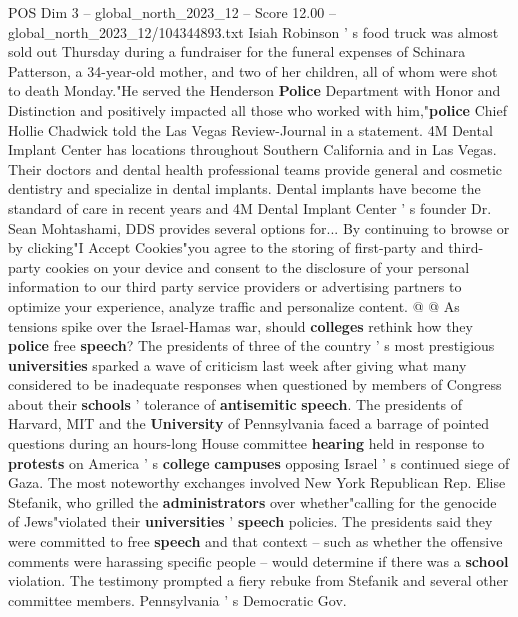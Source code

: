 \begin{textsample}{POS Dim 3 – global\_north\_2023\_12 – Score 12.00 – global\_north\_2023\_12/104344893.txt}  \label{ex:f3_pos_267}
Isiah Robinson ' s food truck was almost sold out Thursday during a fundraiser for the funeral expenses of Schinara Patterson, a 34-year-old mother, and two of her children, all of whom were shot to death Monday."He served the Henderson \textbf{Police} Department with Honor and Distinction and positively impacted all those who worked with him,"\textbf{police} Chief Hollie Chadwick told the Las Vegas Review-Journal in a statement. 4M Dental Implant Center has locations throughout Southern California and in Las Vegas.
Their doctors and dental health professional teams provide general and cosmetic dentistry and specialize in dental implants.
Dental implants have become the standard of care in recent years and 4M Dental Implant Center ' s founder Dr.
Sean Mohtashami, DDS provides several options for...
By continuing to browse or by clicking"I Accept Cookies"you agree to the storing of first-party and third-party cookies on your device and consent to the disclosure of your personal information to our third party service providers or advertising partners to optimize your experience, analyze traffic and personalize content. @ @ As tensions spike over the Israel-Hamas war, should \textbf{colleges} rethink how they \textbf{police} free \textbf{speech}?
The presidents of three of the country ' s most prestigious \textbf{universities} sparked a wave of criticism last week after giving what many considered to be inadequate responses when questioned by members of Congress about their \textbf{schools} ' tolerance of \textbf{antisemitic} \textbf{speech}.
The presidents of Harvard, MIT and the \textbf{University} of Pennsylvania faced a barrage of pointed questions during an hours-long House committee \textbf{hearing} held in response to \textbf{protests} on America ' s \textbf{college} \textbf{campuses} opposing Israel ' s continued siege of Gaza.
The most noteworthy exchanges involved New York Republican Rep.
Elise Stefanik, who grilled the \textbf{administrators} over whether"calling for the genocide of Jews"violated their \textbf{universities} ' \textbf{speech} policies.
The presidents said they were committed to free \textbf{speech} and that context -- such as whether the offensive comments were harassing specific people -- would determine if there was a \textbf{school} violation.
The testimony prompted a fiery rebuke from Stefanik and several other committee members.
Pennsylvania ' s Democratic Gov.

\end{textsample}
